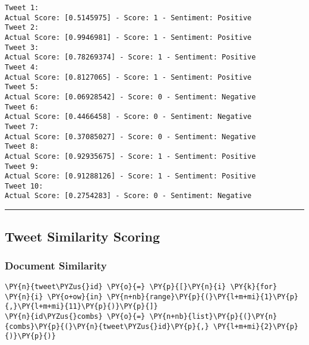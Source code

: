     \begin{Verbatim}[commandchars=\\\{\}]
Tweet 1:
Actual Score: [0.5145975] - Score: 1 - Sentiment: Positive
Tweet 2:
Actual Score: [0.9946981] - Score: 1 - Sentiment: Positive
Tweet 3:
Actual Score: [0.78269374] - Score: 1 - Sentiment: Positive
Tweet 4:
Actual Score: [0.8127065] - Score: 1 - Sentiment: Positive
Tweet 5:
Actual Score: [0.06928542] - Score: 0 - Sentiment: Negative
Tweet 6:
Actual Score: [0.4466458] - Score: 0 - Sentiment: Negative
Tweet 7:
Actual Score: [0.37085027] - Score: 0 - Sentiment: Negative
Tweet 8:
Actual Score: [0.92935675] - Score: 1 - Sentiment: Positive
Tweet 9:
Actual Score: [0.91288126] - Score: 1 - Sentiment: Positive
Tweet 10:
Actual Score: [0.2754283] - Score: 0 - Sentiment: Negative
    \end{Verbatim}

    \begin{center}\rule{0.5\linewidth}{0.5pt}\end{center}

    \hypertarget{tweet-similarity-scoring}{%
\subsection{Tweet Similarity Scoring}\label{tweet-similarity-scoring}}

    \hypertarget{document-similarity}{%
\subsubsection{Document Similarity}\label{document-similarity}}

    \begin{tcolorbox}[breakable, size=fbox, boxrule=1pt, pad at break*=1mm,colback=cellbackground, colframe=cellborder]
\begin{Verbatim}[commandchars=\\\{\}]
\PY{n}{tweet\PYZus{}id} \PY{o}{=} \PY{p}{[}\PY{n}{i} \PY{k}{for} \PY{n}{i} \PY{o+ow}{in} \PY{n+nb}{range}\PY{p}{(}\PY{l+m+mi}{1}\PY{p}{,}\PY{l+m+mi}{11}\PY{p}{)}\PY{p}{]}
\PY{n}{id\PYZus{}combs} \PY{o}{=} \PY{n+nb}{list}\PY{p}{(}\PY{n}{combs}\PY{p}{(}\PY{n}{tweet\PYZus{}id}\PY{p}{,} \PY{l+m+mi}{2}\PY{p}{)}\PY{p}{)}
\end{Verbatim}
\end{tcolorbox}

